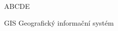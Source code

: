 
\begin{seznamzkratek}{ABCDE}

	      {GIS}
	      {Geografický informační systém}
	      
\end{seznamzkratek}